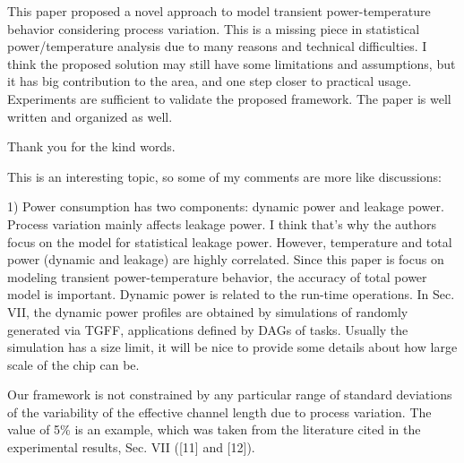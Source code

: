 \begin{reviewer}
This paper proposed a novel approach to model transient power-temperature behavior considering process variation. This is a missing piece in statistical power/temperature analysis due to many reasons and technical difficulties. I think the proposed solution may still have some limitations and assumptions, but it has big contribution to the area, and one step closer to practical usage. Experiments are sufficient to validate the proposed framework. The paper is well written and organized as well.
\end{reviewer}
\begin{authors}
Thank you for the kind words.
\end{authors}

\begin{reviewer}
This is an interesting topic, so some of my comments are more like discussions:

1) Power consumption has two components: dynamic power and leakage power. Process variation mainly affects leakage power. I think that’s why the authors focus on the model for statistical leakage power. However, temperature and total power (dynamic and leakage) are highly correlated. Since this paper is focus on modeling transient power-temperature behavior, the accuracy of total power model is important. Dynamic power is related to the run-time operations. In Sec. VII, the dynamic power profiles are obtained by simulations of randomly generated via TGFF, applications defined by DAGs of tasks. Usually the simulation has a size limit, it will be nice to provide some details about how large scale of the chip can be.
\end{reviewer}
\begin{authors}
Our framework is not constrained by any particular range of standard deviations of the variability of the effective channel length due to process variation.
The value of 5\% is an example, which was taken from the literature cited in the experimental results, Sec. VII ([11] and [12]).
\end{authors}

